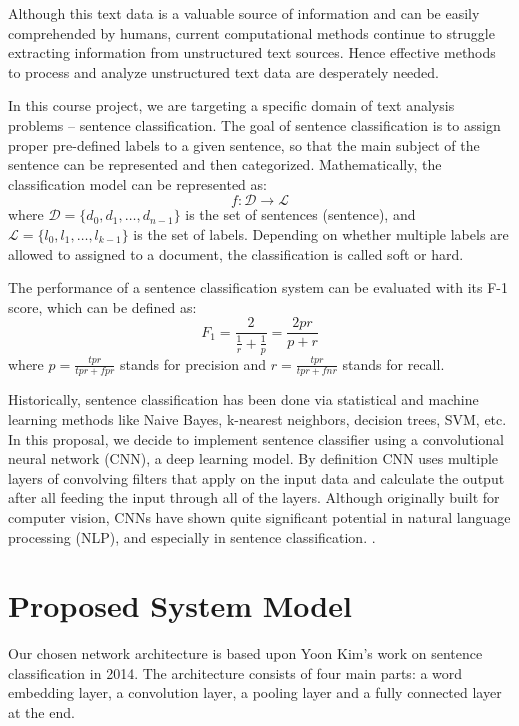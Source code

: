 \documentclass[conference]{IEEEtran}
\begin{document}
    Although this text data is a valuable source of information
    and can be easily comprehended by humans, current computational methods
    continue to struggle extracting information from unstructured text sources\cite{mitchell2015}.
    Hence effective methods to process and analyze unstructured text data are
    desperately needed.
    
    In this course project, we are targeting a specific domain of text analysis
    problems -- sentence classification. The goal of sentence classification is to assign
    proper pre-defined labels to a given sentence, so that the main subject of the 
    sentence can be represented and then categorized\cite{allahyari2017brief}. 
    Mathematically, the classification model can be represented as:
    $$f:\mathcal{D}\rightarrow\mathcal{L}$$
    where $\mathcal{D}=\{d_0, d_1,\ldots, d_{n-1}\}$ is the set of sentences
    (sentence), and $\mathcal{L}=\{l_0, l_1,\ldots, l_{k-1}\}$ is the set of labels.
    Depending on whether multiple labels are allowed to assigned to a document, the 
    classification is called soft or hard\cite{gopal2010multilabel}.
    
    The performance of a sentence classification system can be evaluated with its
    F-1 score, which can be defined as\cite{forman2003extensive}:
    $$F_1=\frac{2}{\frac{1}{r}+\frac{1}{p}}=\frac{2pr}{p+r}$$
    where $p=\frac{tpr}{tpr+fpr}$ stands for precision and $r=\frac{tpr}{tpr+fnr}$ 
    stands for recall.
    
    Historically, sentence classification has been done via statistical 
    and machine learning methods like Naive Bayes, k-nearest neighbors, decision 
    trees, SVM, etc. In this proposal, we decide to implement sentence classifier
    using a convolutional neural network (CNN), a deep learning model. By definition
    CNN uses multiple layers of convolving filters that apply on the input data and 
    calculate the output after all feeding the input through all of the layers. Although
    originally built for computer vision, CNNs have shown quite significant potential in 
    natural language processing (NLP), and especially in sentence classification.
    \cite{kim2014convolutional}. 

\section{Proposed System Model}
     Our chosen network architecture is based upon Yoon Kim's work on sentence
     classification in 2014. The architecture consists of four main parts: a word
     embedding layer, a convolution layer, a pooling layer and a fully connected layer
     at the end.
     
\end{document}
